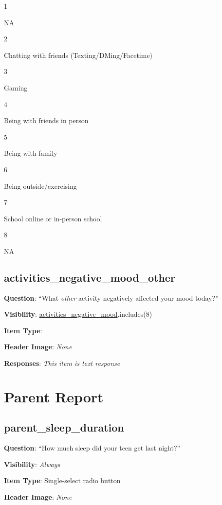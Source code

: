 \documentclass[]{book}
\begin{document}
1

NA

2

Chatting with friends (Texting/DMing/Facetime)

3

Gaming

4

Being with friends in person

5

Being with family

6

Being outside/exercising

7

School online or in-person school

8

NA

\hypertarget{activities_negative_mood_other}{%
\section{activities\_negative\_mood\_other}\label{activities_negative_mood_other}}

\textbf{Question}: ``What \emph{other} activity negatively affected your mood today?''

\textbf{Visibility}: \protect\hyperlink{activities_negative_mood}{activities\_negative\_mood}.includes(8)

\textbf{Item Type}:

\textbf{Header Image}: \emph{None}

\textbf{Responses}: \emph{This item is text response}

\hypertarget{morning_section}{%
\chapter{Parent Report}\label{morning_section}}

\hypertarget{parent_sleep_duration}{%
\section{parent\_sleep\_duration}\label{parent_sleep_duration}}

\textbf{Question}: ``How much sleep did your teen get last night?''

\textbf{Visibility}: \emph{Always}

\textbf{Item Type}: Single-select radio button

\textbf{Header Image}: \emph{None}
\end{document}

